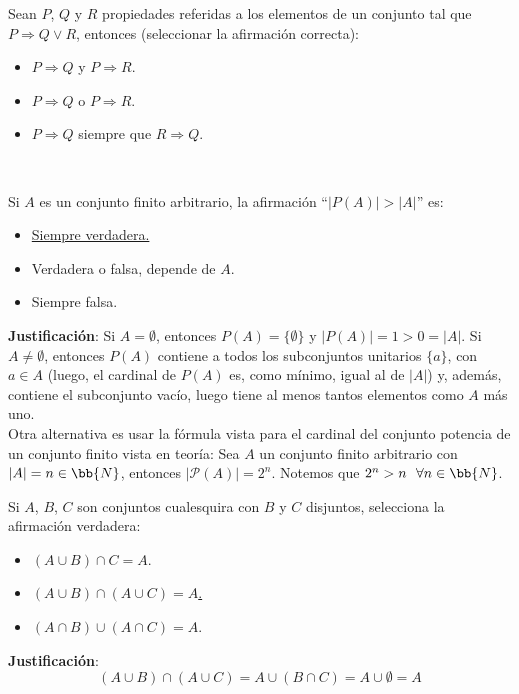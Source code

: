 \begin{ejercicio}
    Sean $P$, $Q$ y $R$ propiedades referidas a los elementos de un conjunto tal que $P \Rightarrow Q \lor R$, entonces (seleccionar la afirmación correcta):
    \begin{itemize}
        \item $P \Rightarrow Q$ y $P \Rightarrow R$.
        \item $P \Rightarrow Q$ o $P \Rightarrow R$.
        \item $P \Rightarrow Q$ siempre que $R \Rightarrow Q$.
    \end{itemize}
\end{ejercicio}

\newpage
\ %
\resetearcontador

\begin{ejercicio}
    Si $A$ es un conjunto finito arbitrario, la afirmación ``$|P(A)| > |A|$'' es:
    \begin{itemize}
        \item \underline{Siempre verdadera.}
        \item Verdadera o falsa, depende de $A$.
        \item Siempre falsa.
    \end{itemize}

    \noindent
    \textbf{Justificación}:
    Si $A = \emptyset$, entonces $P(A) = \{\emptyset\}$ y $|P(A)|=1>0=|A|$.\newline
    Si $A \neq \emptyset$, entonces $P(A)$ contiene a todos los subconjuntos unitarios $\{a\}$, con $a \in A$ (luego, el cardinal de $P(A)$ es, como mínimo, igual al de $|A|$) y, además, contiene el subconjunto vacío, luego tiene al menos tantos elementos como $A$ más uno.\\

    \noindent
    Otra alternativa es usar la fórmula vista para el cardinal del conjunto potencia de un conjunto finito vista en teoría:\newline
    Sea $A$ un conjunto finito arbitrario con $|A| = n \in \bb{N}$, entonces $|\mathcal{P}(A)| = 2^n$.\newline
    Notemos que $2^n > n~~\forall n \in \bb{N}$.
\end{ejercicio}

\begin{ejercicio}
    Si $A$, $B$, $C$ son conjuntos cualesquira con $B$ y $C$ disjuntos, selecciona la afirmación verdadera:
    \begin{itemize}
        \item $(A \cup B)\cap C = A$.
        \item \underline{$(A \cup B)\cap (A \cup C)=A$.}
        \item $(A\cap B)\cup(A \cap C)=A$.
    \end{itemize}

    \noindent
    \textbf{Justificación}:
    $$(A \cup B) \cap (A \cup C) = A \cup (B \cap C) = A \cup \emptyset = A$$
\end{ejercicio}

